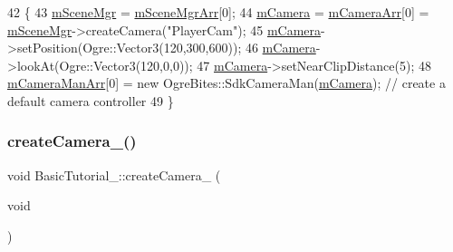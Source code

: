 \begin{DoxyCode}
42 \{
43     \hyperlink{class_base_application_a8a7684f4f9a57ed3089048ad1a913b2d}{mSceneMgr} = \hyperlink{class_basic_tutorial__00_a603779b6087698c57b7989e16d8a9b93}{mSceneMgrArr}[0];
44     \hyperlink{class_base_application_a3829c6b12afe911e97e6b4524b33a38b}{mCamera} = \hyperlink{class_basic_tutorial__00_af8d457d912286a98c0975c52d4faf910}{mCameraArr}[0] = \hyperlink{class_base_application_a8a7684f4f9a57ed3089048ad1a913b2d}{mSceneMgr}->createCamera(\textcolor{stringliteral}{"PlayerCam"});
45     \hyperlink{class_base_application_a3829c6b12afe911e97e6b4524b33a38b}{mCamera}->setPosition(Ogre::Vector3(120,300,600));
46     \hyperlink{class_base_application_a3829c6b12afe911e97e6b4524b33a38b}{mCamera}->lookAt(Ogre::Vector3(120,0,0));
47     \hyperlink{class_base_application_a3829c6b12afe911e97e6b4524b33a38b}{mCamera}->setNearClipDistance(5);
48     \hyperlink{class_basic_tutorial__00_a700c07f924c71e9fa1885a46f599d934}{mCameraManArr}[0] = \textcolor{keyword}{new} OgreBites::SdkCameraMan(\hyperlink{class_base_application_a3829c6b12afe911e97e6b4524b33a38b}{mCamera});   \textcolor{comment}{// create a default
       camera controller}
49 \}
\end{DoxyCode}
\mbox{\label{class_basic_tutorial__00_a8745a127adeb69fa769f832fd41412c0}} 
\subsubsection{\texorpdfstring{create\+Camera\+\_()}{createCamera\_01()}}
{\footnotesize\ttfamily void Basic\+Tutorial\+\_\+::create\+Camera\+\_ (\begin{DoxyParamCaption}\item[{void}]{ }\end{DoxyParamCaption})\hspace{0.3cm}{\ttfamily [protected]}}


